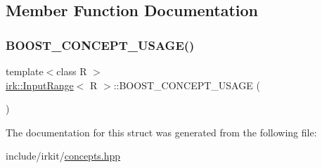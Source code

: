 \subsection{Member Function Documentation}
\mbox{\label{structirk_1_1InputRange_ac405dcd6545d58c930c6a9476578a4ae}} 
\subsubsection{\texorpdfstring{B\+O\+O\+S\+T\+\_\+\+C\+O\+N\+C\+E\+P\+T\+\_\+\+U\+S\+A\+G\+E()}{BOOST\_CONCEPT\_USAGE()}}
{\footnotesize\ttfamily template$<$class R $>$ \\
\mbox{\hyperlink{structirk_1_1InputRange}{irk\+::\+Input\+Range}}$<$ R $>$\+::B\+O\+O\+S\+T\+\_\+\+C\+O\+N\+C\+E\+P\+T\+\_\+\+U\+S\+A\+GE (\begin{DoxyParamCaption}\item[{\mbox{\hyperlink{structirk_1_1InputRange}{Input\+Range}}$<$ R $>$}]{ }\end{DoxyParamCaption})\hspace{0.3cm}{\ttfamily [inline]}}



The documentation for this struct was generated from the following file\+:\begin{DoxyCompactItemize}
\item 
include/irkit/\mbox{\hyperlink{concepts_8hpp}{concepts.\+hpp}}\end{DoxyCompactItemize}
